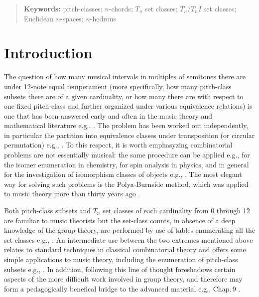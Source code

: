 \documentclass[12pt,a4paper]{article}
\begin{document}
\begin{quotation}
\begin{small}
\noindent
{\bf Keywords:} pitch-classes; $n$-chords; $T_n$ set classes; $T_n/T_nI$ set
classes; Euclidean $n$-spaces; $n$-hedrons
\end{small}
\end{quotation}

\section{Introduction} \label{intro}

The question of how many musical intervals in multiples of semitones there are
under 12-note equal
temperament (more specifically, how many pitch-class subsets there are of a
given cardinality, or how many there are with respect to one fixed pitch-class
and further organized under various equivalence relations) is one that has
been answered early and often in the music theory and mathematical literature
e.g., \cite{Loq84}\cite{Bac17}.   The problem has been worked out
independently, in particular the partition into equivalence classes under
transposition (or circular permutation) e.g.,
\cite{Rah80}\cite{Mor87}\cite{Vie93}.   To this respect, it is worth
emphasyzing combinatorial
problems are not essentially musical: the same procedure can be applied e.g.,
for the isomer enumeration in chemistry, for spin analysis in physics, and in
general for the investigation of isomorphism classes of objects e.g.,
\cite{Ker91}\cite{Ker99}.   The most elegant way for solving such problems
is the Polya-Burnside method, which was applied to music theory more than
thirty years ago \cite{Rei85}.

Both pitch-class subsets and $T_n$ set classes of each cardinality from 0
through 12 are
familiar to music theorists but the set-class counts, in absence of a deep
knowledge of the group theory, are performed by use of tables enumerating all
the set classes e.g.,
\cite{For73}\cite{Rah80}\cite{Mor87}\cite{Mor91}\cite{Str05}.
An intermediate use between the two extremes mentioned above
relates to standard techniques in classical combinatorial theory and offers
some simple applications to music theory, including the enumeration of
pitch-class subsets
e.g., \cite{Mes44}\cite{Coh91}\cite{Hoo07}.   In addition, following this line
of thought foreshadows certain aspects of the more difficult work involved in
group theory, and therefore may form a pedagogically benefical bridge to the
advanced material e.g., \cite{Ben06} Chap.\,9 \cite{Hoo07}\cite{Fri99}.
\end{document}
